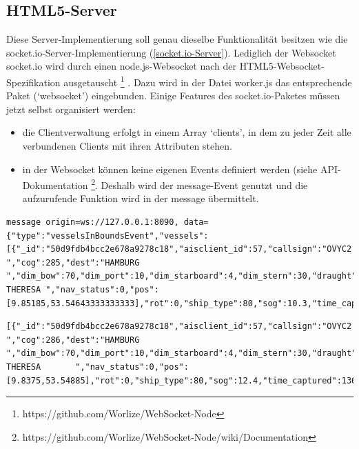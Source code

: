 \subsection{HTML5-Server}\label{HTML5-Server}
Diese Server-Implementierung soll genau dieselbe Funktionalität besitzen wie die socket.io-Server-Implementierung (\ref{socket.io-Server}). Lediglich der Websocket socket.io wird durch einen node.js-Websocket nach der HTML5-Websocket-Spezifikation ausgetauscht \footnote{\label{foot:2}https://github.com/Worlize/WebSocket-Node} . Dazu wird in der Datei worker.js das entsprechende Paket (‘websocket’) eingebunden.
Einige Features des socket.io-Paketes müssen jetzt selbst organisiert werden: 
\begin{itemize}
\item die Clientverwaltung erfolgt in einem Array ‘clients’, in dem zu jeder Zeit alle verbundenen Clients mit ihren Attributen stehen. 
\item in der Websocket können keine eigenen Events definiert werden (siehe API-Dokumentation \footnote{\label{foot:2}https://github.com/Worlize/WebSocket-Node/wiki/Documentation}. Deshalb wird der message-Event genutzt und die aufzurufende Funktion wird in der message übermittelt.
\end{itemize}
\begin{lstlisting}[caption= vom Websocket-Server gesendete message, label=websocket-message]
message origin=ws://127.0.0.1:8090, data={"type":"vesselsInBoundsEvent","vessels":[{"_id":"50d9fdb4bcc2e678a9278c18","aisclient_id":57,"callsign":"OVYC2 ","cog":285,"dest":"HAMBURG ","dim_bow":70,"dim_port":10,"dim_starboard":4,"dim_stern":30,"draught":54,"imo":"9363170","mmsi":220515000,"msgid":1,"name":"RIKKE THERESA ","nav_status":0,"pos":[9.85185,53.54643333333333],"rot":0,"ship_type":80,"sog":10.3,"time_captured":1366733896000,"time_received":1366733855248,"true_heading":286}]}

\end{lstlisting}
\begin{lstlisting}[caption= vom socket.io-Server gesendete message, label=socket.io-message]
[{"_id":"50d9fdb4bcc2e678a9278c18","aisclient_id":57,"callsign":"OVYC2  ","cog":286,"dest":"HAMBURG             ","dim_bow":70,"dim_port":10,"dim_starboard":4,"dim_stern":30,"draught":54,"imo":"9363170","mmsi":220515000,"msgid":1,"name":"RIKKE THERESA       ","nav_status":0,"pos":[9.8375,53.54885],"rot":0,"ship_type":80,"sog":12.4,"time_captured":1366734056000,"time_received":1366734014715,"true_heading":288}]
\end{lstlisting}
